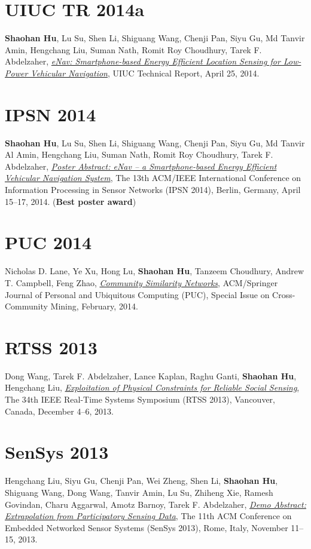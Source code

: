 \section{\sc UIUC TR 2014a }\hypertarget{hu2014uiuc1}{} \textbf{Shaohan Hu}, Lu Su, Shen Li, Shiguang Wang, Chenji Pan, Siyu Gu, Md Tanvir Amin, Hengchang Liu, Suman Nath, Romit Roy Choudhury, Tarek F. Abdelzaher, \href{https://www.ideals.illinois.edu/handle/2142/48917}{\emph{eNav: Smartphone-based Energy Efficient Location Sensing for Low-Power Vehicular Navigation}}, \textsf{UIUC Technical Report}, April 25, 2014.

\section{\sc IPSN 2014}\hypertarget{hu2014ipsn}{} \textbf{Shaohan Hu}, Lu Su, Shen Li, Shiguang Wang, Chenji Pan, Siyu Gu, Md Tanvir Al Amin, Hengchang Liu, Suman Nath, Romit Roy Choudhury, Tarek F. Abdelzaher, \href{http://dl.acm.org/citation.cfm?id=2602374}{\emph{Poster Abstract: eNav -- a Smartphone-based Energy Efficient Vehicular Navigation System}}, \textsf{The 13th ACM/IEEE International Conference on Information Processing in Sensor Networks (IPSN 2014)}, Berlin, Germany, April 15--17, 2014. (\textbf{Best poster award})

\section{\sc PUC 2014}\hypertarget{lane2013puc}{} Nicholas D. Lane, Ye Xu, Hong Lu, \textbf{Shaohan Hu}, Tanzeem Choudhury, Andrew T. Campbell, Feng Zhao, \href{http://link.springer.com/article/10.1007/s00779-013-0655-1}{\emph{Community Similarity Networks}}, \textsf{ACM/Springer Journal of Personal and Ubiquitous Computing (PUC), Special Issue on Cross-Community Mining}, February, 2014.

\section{\sc RTSS 2013}\hypertarget{wang2013rtss}{} Dong Wang, Tarek F. Abdelzaher, Lance Kaplan, Raghu Ganti, \textbf{Shaohan Hu}, Hengchang Liu, \href{http://ieeexplore.ieee.org/xpl/articleDetails.jsp?arnumber=6728876}{\emph{Exploitation of Physical Constraints for Reliable Social Sensing}}, \textsf{The 34th IEEE Real-Time Systems Symposium (RTSS 2013)}, Vancouver, Canada, December 4--6, 2013.

\section{\sc SenSys 2013}\hypertarget{liu2013sensys}{} Hengchang Liu, Siyu Gu, Chenji Pan, Wei Zheng, Shen Li, \textbf{Shaohan Hu}, Shiguang Wang, Dong Wang, Tanvir Amin, Lu Su, Zhiheng Xie, Ramesh Govindan, Charu Aggarwal, Amotz Barnoy, Tarek F. Abdelzaher, \href{http://portal.acm.org/citation.cfm?id=2517431}{\emph{Demo Abstract: Extrapolation from Participatory Sensing Data}}, \textsf{The 11th ACM Conference on Embedded Networked Sensor Systems (SenSys 2013)}, Rome, Italy, November 11--15, 2013.

